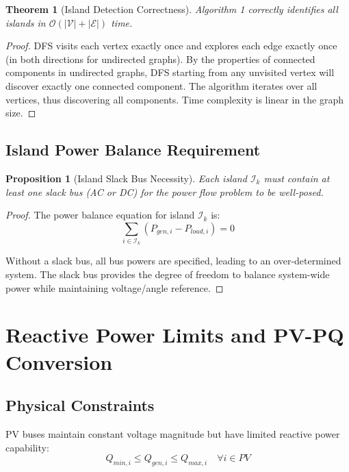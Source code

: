 \documentclass[11pt]{article}
\newtheorem{theorem}{Theorem}
\newtheorem{proposition}{Proposition}
\begin{document}
\begin{theorem}[Island Detection Correctness]
Algorithm 1 correctly identifies all islands in $\mathcal{O}(|\mathcal{V}| + |\mathcal{E}|)$ time.
\end{theorem}

\begin{proof}
DFS visits each vertex exactly once and explores each edge exactly once (in both directions for undirected graphs). By the properties of connected components in undirected graphs, DFS starting from any unvisited vertex will discover exactly one connected component. The algorithm iterates over all vertices, thus discovering all components. Time complexity is linear in the graph size.
\end{proof}

\subsection{Island Power Balance Requirement}

\begin{proposition}[Island Slack Bus Necessity]
Each island $\mathcal{I}_k$ must contain at least one slack bus (AC or DC) for the power flow problem to be well-posed.
\end{proposition}

\begin{proof}
The power balance equation for island $\mathcal{I}_k$ is:
\begin{equation}
\sum_{i \in \mathcal{I}_k} (P_{gen,i} - P_{load,i}) = 0
\end{equation}

Without a slack bus, all bus powers are specified, leading to an over-determined system. The slack bus provides the degree of freedom to balance system-wide power while maintaining voltage/angle reference.
\end{proof}

\section{Reactive Power Limits and PV-PQ Conversion}

\subsection{Physical Constraints}

PV buses maintain constant voltage magnitude but have limited reactive power capability:
\begin{equation}
Q_{min,i} \leq Q_{gen,i} \leq Q_{max,i} \quad \forall i \in PV
\end{equation}
\end{document}
